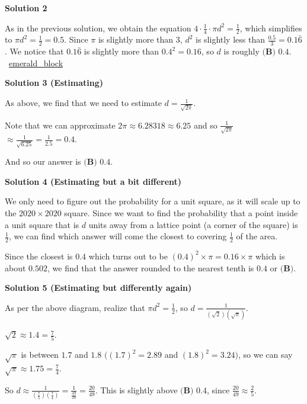 \begin{enumerate}
\textbf{Solution 2}

As in the previous solution, we obtain the equation $4 \cdot \frac{1}{4} \cdot \pi d^2 = \frac{1}{2}$, which simplifies to $\pi d^2 = \frac{1}{2} = 0.5$. Since $\pi$ is slightly more than $3$, $d^2$ is slightly less than $\frac{0.5}{3} = 0.1\bar{6}$. We notice that $0.1\bar{6}$ is slightly more than $0.4^2 = 0.16$, so $d$ is roughly $\boxed{\textbf{(B) } 0.4}.$ ~\href{https://artofproblemsolving.com/wiki/index.php?title=User:Emerald\_block}{emerald\_block}

 



\textbf{Solution 3 (Estimating)}

As above, we find that we need to estimate $d = \frac{1}{\sqrt{2\pi}}$. 

 Note that we can approximate $2\pi \approx 6.28318 \approx 6.25$ and so $\frac{1}{\sqrt{2\pi}}$ $\approx \frac{1}{\sqrt{6.25}}=\frac{1}{2.5}=0.4$.

 And so our answer is $\boxed{\textbf{(B) } 0.4}$.

 



\textbf{Solution 4 (Estimating but a bit different)}

We only need to figure out the probability for a unit square, as it will scale up to the $2020\times 2020$ square. Since we want to find the probability that a point inside a unit square that is $d$ units away from a lattice point (a corner of the square) is $\frac{1}{2}$, we can find which answer will come the closest to covering $\frac{1}{2}$ of the area. 

 Since the closest is $0.4$ which turns out to be $(0.4)^2\times \pi = 0.16 \times \pi$ which is about $0.502$, we find that the answer rounded to the nearest tenth is $0.4$ or $\boxed{\textbf{(B)}}$.

 



\textbf{Solution 5 (Estimating but differently again)}

As per the above diagram, realize that $\pi d^2 = \frac{1}{2}$, so $d = \frac{1}{(\sqrt{2})(\sqrt{\pi})}$.

 $\sqrt{2} \approx 1.4 = \frac{7}{5}$.

 $\sqrt{\pi}$ is between $1.7$ and $1.8$ $((1.7)^2 = 2.89$ and $(1.8)^2 = 3.24)$, so we can say $\sqrt{\pi} \approx 1.75 = \frac{7}{4}$.

 So $d \approx \frac{1}{(\frac{7}{5})(\frac{7}{4})} = \frac{1}{\frac{49}{20}} = \frac{20}{49}$. This is slightly above $\boxed{\textbf{(B) } 0.4}$, since $\frac{20}{49} \approx \frac{2}{5}$.


\end{enumerate}
